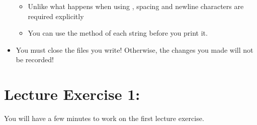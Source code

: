 \documentclass[letterpaper,10pt,english]{sphinxmanual}
\begin{document}
\begin{itemize}
\begin{itemize}
\item {} 
Unlike what happens when using , spacing and newline
characters are required explicitly

\item {} 
You can use the  method of each string before you
print it.

\end{itemize}

\item {} 
You must close the files you write! Otherwise, the changes you made
will not be recorded!

%
\begin{sphinxVerbatim}[commandchars=\\\{\}]
\end{sphinxVerbatim}

\end{itemize}


\section{Lecture Exercise 1:}
\label{\detokenize{lecture_notes/lec13_files_web:lecture-exercise-1}}
You will have a few minutes to work on the first lecture exercise.
\end{document}
